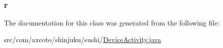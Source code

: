 \hypertarget{classcom_1_1axcoto_1_1shinjuku_1_1sushi_1_1_device_activity_a0e73f743b74362a313af6f4bc6057b9c}{
\subsubsection[{r}]{ {\bf r}}}\label{classcom_1_1axcoto_1_1shinjuku_1_1sushi_1_1_device_activity_a0e73f743b74362a313af6f4bc6057b9c}


\-The documentation for this class was generated from the following file\-:\begin{DoxyCompactItemize}
\item 
src/com/axcoto/shinjuku/sushi/\hyperlink{_device_activity_8java}{\-Device\-Activity.\-java}\end{DoxyCompactItemize}
